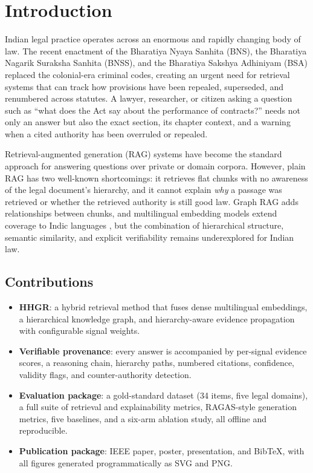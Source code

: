 \section{Introduction}

Indian legal practice operates across an enormous and rapidly changing body of
law. The recent enactment of the Bharatiya Nyaya Sanhita (BNS), the Bharatiya
Nagarik Suraksha Sanhita (BNSS), and the Bharatiya Sakshya Adhiniyam (BSA)
replaced the colonial-era criminal codes, creating an urgent need for
retrieval systems that can track how provisions have been repealed, superseded,
and renumbered across statutes. A lawyer, researcher, or citizen asking a
question such as ``what does the Act say about the performance of contracts?''
needs not only an answer but also the exact section, its chapter context, and a
warning when a cited authority has been overruled or repealed.

Retrieval-augmented generation (RAG) systems \cite{lewis2020rag} have become
the standard approach for answering questions over private or domain corpora.
However, plain RAG has two well-known shortcomings: it retrieves flat chunks
with no awareness of the legal document's hierarchy, and it cannot explain
\emph{why} a passage was retrieved or whether the retrieved authority is still
good law. Graph RAG \cite{edge2024graphrag} adds relationships between chunks,
and multilingual embedding models extend coverage to Indic languages
\cite{chen2023multilingual}, but the combination of hierarchical structure,
semantic similarity, and explicit verifiability remains underexplored for
Indian law.

\subsection{Contributions}

\begin{itemize}
  \item \textbf{HHGR}: a hybrid retrieval method that fuses dense multilingual
        embeddings, a hierarchical knowledge graph, and hierarchy-aware
        evidence propagation with configurable signal weights.
  \item \textbf{Verifiable provenance}: every answer is accompanied by
        per-signal evidence scores, a reasoning chain, hierarchy paths,
        numbered citations, confidence, validity flags, and counter-authority
        detection.
  \item \textbf{Evaluation package}: a gold-standard dataset (34 items, five
        legal domains), a full suite of retrieval and explainability metrics,
        RAGAS-style generation metrics, five baselines, and a six-arm ablation
        study, all offline and reproducible.
  \item \textbf{Publication package}: IEEE paper, poster, presentation, and
        BibTeX, with all figures generated programmatically as SVG and PNG.
\end{itemize}

